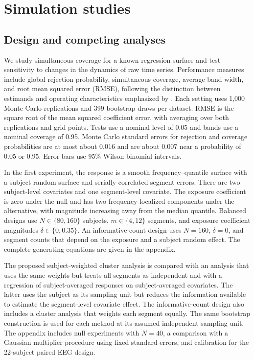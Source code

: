 \section{Simulation studies}\label{sec:simulation}
\subsection{Design and competing analyses}
We study simultaneous coverage for a known regression surface and test sensitivity to changes in the dynamics of raw time series. Performance measures include global rejection probability, simultaneous coverage, average band width, and root mean squared error (RMSE), following the distinction between estimands and operating characteristics emphasized by \citet{Morris2019}. Each setting uses 1,000 Monte Carlo replications and 399 bootstrap draws per dataset. RMSE is the square root of the mean squared coefficient error, with averaging over both replications and grid points. Tests use a nominal level of 0.05 and bands use a nominal coverage of 0.95. Monte Carlo standard errors for rejection and coverage probabilities are at most about 0.016 and are about 0.007 near a probability of 0.05 or 0.95. Error bars use 95\% Wilson binomial intervals.

In the first experiment, the response is a smooth frequency--quantile surface with a subject random surface and serially correlated segment errors. There are two subject-level covariates and one segment-level covariate. The exposure coefficient is zero under the null and has two frequency-localized components under the alternative, with magnitude increasing away from the median quantile. Balanced designs use $N\in\{80,160\}$ subjects, $m\in\{4,12\}$ segments, and exposure coefficient magnitudes $\delta\in\{0,0.35\}$. An informative-count design uses $N=160$, $\delta=0$, and segment counts that depend on the exposure and a subject random effect. The complete generating equations are given in the appendix.

The proposed subject-weighted cluster analysis is compared with an analysis that uses the same weights but treats all segments as independent and with a regression of subject-averaged responses on subject-averaged covariates. The latter uses the subject as its sampling unit but reduces the information available to estimate the segment-level covariate effect. The informative-count design also includes a cluster analysis that weights each segment equally. The same bootstrap construction is used for each method at its assumed independent sampling unit. The appendix includes null experiments with $N=40$, a comparison with a Gaussian multiplier procedure using fixed standard errors, and calibration for the 22-subject paired EEG design.

